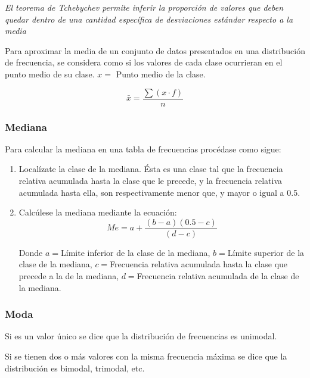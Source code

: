 \emph{El teorema de Tchebychev permite inferir la proporción de valores que deben quedar dentro de una cantidad específica de desviaciones estándar respecto a la media}

Para aproximar la media de un conjunto de datos presentados
en una distribución de frecuencia, se considera como si los
valores de cada clase ocurrieran en el punto medio de su clase.
$x=$ Punto medio de la clase.

\begin{equation}
    \bar{x}=\frac{\sum (x\cdot f)}{n}
\end{equation}

\subsubsection{Mediana}

Para calcular la mediana en una tabla de
frecuencias procédase como sigue:

\begin{enumerate}
    \item Localízate la clase de la mediana. Ésta es
          una clase tal que la frecuencia relativa
          acumulada hasta la clase que le precede, y la
          frecuencia relativa acumulada hasta ella, son
          respectivamente menor que, y mayor o igual
          a 0.5.

    \item Calcúlese la mediana mediante la ecuación:
          \begin{equation}
              Me=a+\frac{(b-a)(0.5-c)}{(d-c)}
          \end{equation}

          Donde $a=$Límite inferior de la clase de la mediana,
          $b=$Límite superior de la clase de la mediana,
          $c=$Frecuencia relativa acumulada hasta la clase que precede a la de la mediana,
          $d=$Frecuencia relativa acumulada de la clase de la mediana.
\end{enumerate}

\subsubsection{Moda}

Si es un valor único se dice que la distribución de frecuencias es unimodal.

Si se tienen dos o más valores con la misma frecuencia máxima se dice que la distribución es bimodal, trimodal,
etc.

